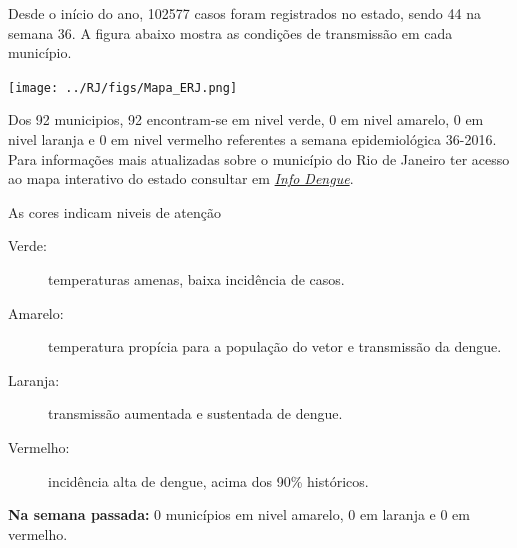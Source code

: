 \documentclass[10pt]{article} %
\begin{document}
\begin{minipage}[t]{.66\linewidth} %

  \hypertarget{estado}{} %

Desde o início do ano, 102577 casos foram registrados no estado, sendo 44 na semana 36. A figura abaixo mostra as condições de transmissão em cada município.

\texttt{[image: ../RJ/figs/Mapa\_ERJ.png]}
  
  Dos 92 municipios, 92 encontram-se em nivel verde, 0 em nivel amarelo, 0 em nivel laranja e 0 em nivel vermelho referentes a semana epidemiológica 36-2016. Para informações mais atualizadas
sobre o município do Rio de Janeiro ter acesso ao mapa interativo do estado consultar em \href{http://info.dengue.mat.br}{\textit{Info Dengue}}.


  \vspace{1cm}
\begin{mdframed}[style=intextbox,frametitle={}] %

\hypertarget{descriptivebox}{} %
As cores indicam niveis de atenção
\begin{description}
\item[Verde:] temperaturas amenas, baixa incidência de casos.      
\item[Amarelo:] temperatura propícia para a população do vetor e transmissão da dengue.
\item[Laranja:] transmissão aumentada e sustentada de dengue. 
\item[Vermelho:] incidência alta de dengue, acima dos 90\% históricos.
\end{description}
\end{mdframed}

\textbf{Na semana passada:} 0 municípios em nivel amarelo, 0 em laranja e 0 em vermelho.  

\end{minipage} %
\end{document}
